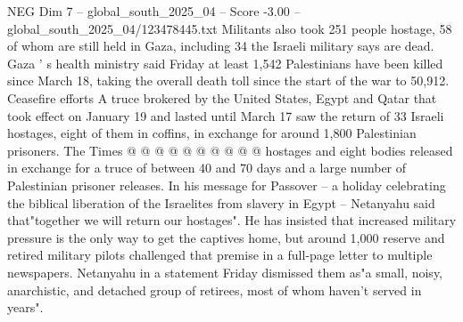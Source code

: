 \begin{textsample}{NEG Dim 7 – global\_south\_2025\_04 – Score -3.00 – global\_south\_2025\_04/123478445.txt}
Militants also took 251 people hostage, 58 of whom are still held in Gaza, including 34 the Israeli military says are dead.
Gaza ' s health ministry said Friday at least 1,542 Palestinians have been killed since March 18, taking the overall death toll since the start of the war to 50,912.
Ceasefire efforts A truce brokered by the United States, Egypt and Qatar that took effect on January 19 and lasted until March 17 saw the return of 33 Israeli hostages, eight of them in coffins, in exchange for around 1,800 Palestinian prisoners.
The Times @ @ @ @ @ @ @ @ @ @ hostages and eight bodies released in exchange for a truce of between 40 and 70 days and a large number of Palestinian prisoner releases.
In his message for Passover -- a holiday celebrating the biblical liberation of the Israelites from slavery in Egypt -- Netanyahu said that"together we will return our hostages".
He has insisted that increased military pressure is the only way to get the captives home, but around 1,000 reserve and retired military pilots challenged that premise in a full-page letter to multiple newspapers.
Netanyahu in a statement Friday dismissed them as"a small, noisy, anarchistic, and detached group of retirees, most of whom haven't served in years".

\end{textsample}
